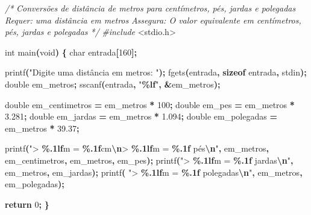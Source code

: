 \documentclass[
  11pt,
  a4paper,
]{scrbook}
\newenvironment{Shaded}{\begin{snugshade}}{\end{snugshade}}
\newcommand{\CommentTok}[1]{\textcolor[rgb]{0.56,0.35,0.01}{\textit{#1}}}
\newcommand{\ControlFlowTok}[1]{\textcolor[rgb]{0.13,0.29,0.53}{\textbf{#1}}}
\newcommand{\DataTypeTok}[1]{\textcolor[rgb]{0.13,0.29,0.53}{#1}}
\newcommand{\DecValTok}[1]{\textcolor[rgb]{0.00,0.00,0.81}{#1}}
\newcommand{\FloatTok}[1]{\textcolor[rgb]{0.00,0.00,0.81}{#1}}
\newcommand{\ImportTok}[1]{#1}
\newcommand{\KeywordTok}[1]{\textcolor[rgb]{0.13,0.29,0.53}{\textbf{#1}}}
\newcommand{\NormalTok}[1]{#1}
\newcommand{\OperatorTok}[1]{\textcolor[rgb]{0.81,0.36,0.00}{\textbf{#1}}}
\newcommand{\PreprocessorTok}[1]{\textcolor[rgb]{0.56,0.35,0.01}{\textit{#1}}}
\newcommand{\SpecialCharTok}[1]{\textcolor[rgb]{0.81,0.36,0.00}{\textbf{#1}}}
\newcommand{\StringTok}[1]{\textcolor[rgb]{0.31,0.60,0.02}{#1}}
\begin{document}
\begin{Shaded}
\begin{Highlighting}[]
\CommentTok{/*}
\CommentTok{Conversões de distância de metros para centímetros, pés, jardas e polegadas}
\CommentTok{Requer: uma distância em metros}
\CommentTok{Assegura: O valor equivalente em centímetros, pés, jardas e polegadas}
\CommentTok{*/}
\PreprocessorTok{\#include }\ImportTok{\textless{}stdio.h\textgreater{}}

\DataTypeTok{int}\NormalTok{ main}\OperatorTok{(}\DataTypeTok{void}\OperatorTok{)} \OperatorTok{\{}
    \DataTypeTok{char}\NormalTok{ entrada}\OperatorTok{[}\DecValTok{160}\OperatorTok{];}

\NormalTok{    printf}\OperatorTok{(}\StringTok{"Digite uma distância em metros: "}\OperatorTok{);}\NormalTok{ fgets}\OperatorTok{(}\NormalTok{entrada}\OperatorTok{,}
          \KeywordTok{sizeof}\NormalTok{ entrada}\OperatorTok{,}\NormalTok{ stdin}\OperatorTok{);}
    \DataTypeTok{double}\NormalTok{ em\_metros}\OperatorTok{;}\NormalTok{ sscanf}\OperatorTok{(}\NormalTok{entrada}\OperatorTok{,} \StringTok{"}\SpecialCharTok{\%lf}\StringTok{"}\OperatorTok{,} \OperatorTok{\&}\NormalTok{em\_metros}\OperatorTok{);}

    \DataTypeTok{double}\NormalTok{ em\_centimetros }\OperatorTok{=}\NormalTok{ em\_metros }\OperatorTok{*} \DecValTok{100}\OperatorTok{;} \DataTypeTok{double}\NormalTok{ em\_pes }\OperatorTok{=}\NormalTok{ em\_metros }\OperatorTok{*}
        \FloatTok{3.281}\OperatorTok{;} \DataTypeTok{double}\NormalTok{ em\_jardas }\OperatorTok{=}\NormalTok{ em\_metros }\OperatorTok{*} \FloatTok{1.094}\OperatorTok{;} \DataTypeTok{double}\NormalTok{ em\_polegadas}
        \OperatorTok{=}\NormalTok{ em\_metros }\OperatorTok{*} \FloatTok{39.37}\OperatorTok{;}

\NormalTok{    printf}\OperatorTok{(}\StringTok{"\textgreater{} }\SpecialCharTok{\%.1lf}\StringTok{m = }\SpecialCharTok{\%.1f}\StringTok{cm}\SpecialCharTok{\textbackslash{}n}\StringTok{\textgreater{} }\SpecialCharTok{\%.1lf}\StringTok{m = }\SpecialCharTok{\%.1f}\StringTok{ pés}\SpecialCharTok{\textbackslash{}n}\StringTok{"}\OperatorTok{,}\NormalTok{ em\_metros}\OperatorTok{,}
\NormalTok{           em\_centimetros}\OperatorTok{,}\NormalTok{ em\_metros}\OperatorTok{,}\NormalTok{ em\_pes}\OperatorTok{);}
\NormalTok{    printf}\OperatorTok{(}\StringTok{"\textgreater{} }\SpecialCharTok{\%.1lf}\StringTok{m = }\SpecialCharTok{\%.1f}\StringTok{ jardas}\SpecialCharTok{\textbackslash{}n}\StringTok{"}\OperatorTok{,}\NormalTok{ em\_metros}\OperatorTok{,}\NormalTok{ em\_jardas}\OperatorTok{);}\NormalTok{ printf}\OperatorTok{(}
        \StringTok{"\textgreater{} }\SpecialCharTok{\%.1lf}\StringTok{m = }\SpecialCharTok{\%.1f}\StringTok{ polegadas}\SpecialCharTok{\textbackslash{}n}\StringTok{"}\OperatorTok{,}\NormalTok{ em\_metros}\OperatorTok{,}\NormalTok{ em\_polegadas}\OperatorTok{);}

    \ControlFlowTok{return} \DecValTok{0}\OperatorTok{;}
\OperatorTok{\}}
\end{Highlighting}
\end{Shaded}
\end{document}
